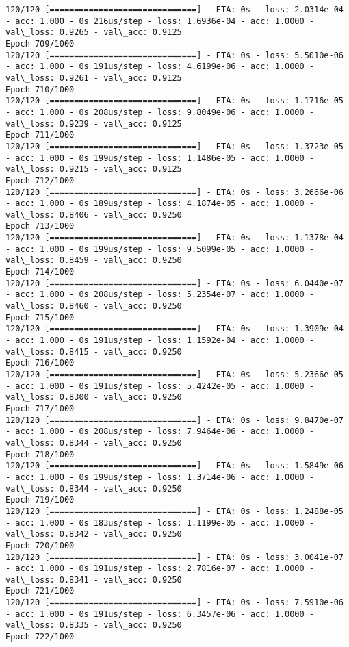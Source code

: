 \documentclass[11pt]{article}
\begin{document}
\begin{Verbatim}[commandchars=\\\{\}]
120/120 [==============================] - ETA: 0s - loss: 2.0314e-04 - acc: 1.000 - 0s 216us/step - loss: 1.6936e-04 - acc: 1.0000 - val\_loss: 0.9265 - val\_acc: 0.9125
Epoch 709/1000
120/120 [==============================] - ETA: 0s - loss: 5.5010e-06 - acc: 1.000 - 0s 191us/step - loss: 4.6199e-06 - acc: 1.0000 - val\_loss: 0.9261 - val\_acc: 0.9125
Epoch 710/1000
120/120 [==============================] - ETA: 0s - loss: 1.1716e-05 - acc: 1.000 - 0s 208us/step - loss: 9.8049e-06 - acc: 1.0000 - val\_loss: 0.9239 - val\_acc: 0.9125
Epoch 711/1000
120/120 [==============================] - ETA: 0s - loss: 1.3723e-05 - acc: 1.000 - 0s 199us/step - loss: 1.1486e-05 - acc: 1.0000 - val\_loss: 0.9215 - val\_acc: 0.9125
Epoch 712/1000
120/120 [==============================] - ETA: 0s - loss: 3.2666e-06 - acc: 1.000 - 0s 189us/step - loss: 4.1874e-05 - acc: 1.0000 - val\_loss: 0.8406 - val\_acc: 0.9250
Epoch 713/1000
120/120 [==============================] - ETA: 0s - loss: 1.1378e-04 - acc: 1.000 - 0s 199us/step - loss: 9.5099e-05 - acc: 1.0000 - val\_loss: 0.8459 - val\_acc: 0.9250
Epoch 714/1000
120/120 [==============================] - ETA: 0s - loss: 6.0440e-07 - acc: 1.000 - 0s 208us/step - loss: 5.2354e-07 - acc: 1.0000 - val\_loss: 0.8460 - val\_acc: 0.9250
Epoch 715/1000
120/120 [==============================] - ETA: 0s - loss: 1.3909e-04 - acc: 1.000 - 0s 191us/step - loss: 1.1592e-04 - acc: 1.0000 - val\_loss: 0.8415 - val\_acc: 0.9250
Epoch 716/1000
120/120 [==============================] - ETA: 0s - loss: 5.2366e-05 - acc: 1.000 - 0s 191us/step - loss: 5.4242e-05 - acc: 1.0000 - val\_loss: 0.8300 - val\_acc: 0.9250
Epoch 717/1000
120/120 [==============================] - ETA: 0s - loss: 9.8470e-07 - acc: 1.000 - 0s 208us/step - loss: 7.9464e-06 - acc: 1.0000 - val\_loss: 0.8344 - val\_acc: 0.9250
Epoch 718/1000
120/120 [==============================] - ETA: 0s - loss: 1.5849e-06 - acc: 1.000 - 0s 199us/step - loss: 1.3714e-06 - acc: 1.0000 - val\_loss: 0.8344 - val\_acc: 0.9250
Epoch 719/1000
120/120 [==============================] - ETA: 0s - loss: 1.2488e-05 - acc: 1.000 - 0s 183us/step - loss: 1.1199e-05 - acc: 1.0000 - val\_loss: 0.8342 - val\_acc: 0.9250
Epoch 720/1000
120/120 [==============================] - ETA: 0s - loss: 3.0041e-07 - acc: 1.000 - 0s 191us/step - loss: 2.7816e-07 - acc: 1.0000 - val\_loss: 0.8341 - val\_acc: 0.9250
Epoch 721/1000
120/120 [==============================] - ETA: 0s - loss: 7.5910e-06 - acc: 1.000 - 0s 191us/step - loss: 6.3457e-06 - acc: 1.0000 - val\_loss: 0.8335 - val\_acc: 0.9250
Epoch 722/1000

\end{Verbatim}
\end{document}
